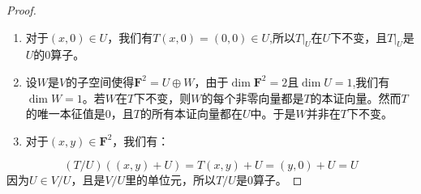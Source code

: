 \documentclass[10pt,a4paper,UTF8]{article}
\begin{document}
\begin{proof}
\begin{enumerate}
\item 对于\((x,0)\in U\)，我们有\(T(x,0) = (0,0)\in U\),所以\(T|_{U}\)在\(U\)下不变，且\(T|_{U}\)是\(U\)的\(0\)算子。
\item 设\(W\)是\(V\)的子空间使得\(\mathbf{F}^{2} = U\oplus W\)，由于\(\dim \mathbf{F}^{2} = 2\)且\(\dim U = 1\),我们有\(\dim W = 1\)。若\(W\)在\(T\)下不变，则\(W\)的每个非零向量都是\(T\)的本证向量。然而\(T\)的唯一本征值是\(0\)，且\(T\)的所有本证向量都在\(U\)中。于是\(W\)并非在\(T\)下不变。
\item 对于\((x,y)\in \mathbf{F}^{2}\)，我们有：
\end{enumerate}
\[(T/U)((x,y) + U) = T(x,y) + U = (y,0) + U = U\]
因为\(U\in V/U\)，且是\(V/U\)里的单位元，所以\(T/U\)是\(0\)算子。
\end{proof}
\end{document}
